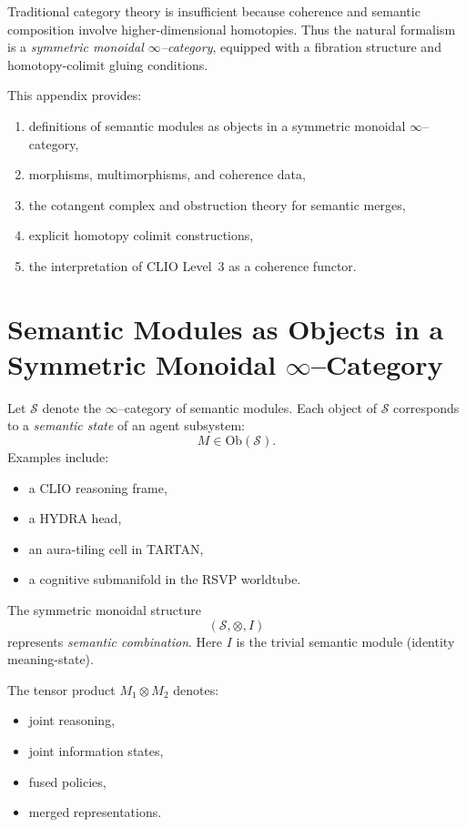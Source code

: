 \documentclass[12pt,oneside]{book}
\theoremstyle{plain}
\theoremstyle{definition}
\def\mathbb#1{#1}%
\begin{document}
Traditional category theory is insufficient because coherence and semantic composition involve higher-dimensional homotopies.
Thus the natural formalism is a \emph{symmetric monoidal $\infty$--category}, equipped with a fibration structure and homotopy-colimit
gluing conditions.

This appendix provides:
\begin{enumerate}
  \item definitions of semantic modules as objects in a symmetric monoidal $\infty$--category,
  \item morphisms, multimorphisms, and coherence data,
  \item the cotangent complex and obstruction theory for semantic merges,
  \item explicit homotopy colimit constructions,
  \item the interpretation of CLIO Level~3 as a coherence functor.
\end{enumerate}

\section{Semantic Modules as Objects in a Symmetric Monoidal $\infty$--Category}

Let $\mathcal{S}$ denote the $\infty$--category of semantic modules.  
Each object of $\mathcal{S}$ corresponds to a \emph{semantic state} of an agent subsystem:
\[
M \in \mathrm{Ob}(\mathcal{S}).
\]
Examples include:
\begin{itemize}
  \item a CLIO reasoning frame,
  \item a HYDRA head,
  \item an aura-tiling cell in TARTAN,
  \item a cognitive submanifold in the RSVP worldtube.
\end{itemize}

The symmetric monoidal structure
\[
(\mathcal{S}, \otimes, \mathbb{I})
\]
represents \emph{semantic combination}.  
Here $\mathbb{I}$ is the trivial semantic module (identity meaning-state).

The tensor product $M_1 \otimes M_2$ denotes:
\begin{itemize}
  \item joint reasoning,
  \item joint information states,
  \item fused policies,
  \item merged representations.
\end{itemize}
\end{document}
